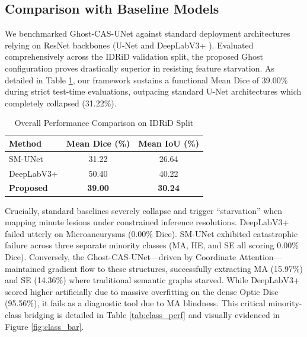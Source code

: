 \subsection{Comparison with Baseline Models}
We benchmarked Ghost-CAS-UNet against standard deployment architectures relying on ResNet backbones (U-Net \cite{unet_2015} and DeepLabV3+ \cite{deeplabv3_2018}). Evaluated comprehensively across the IDRiD validation split, the proposed Ghost configuration proves drastically superior in resisting feature starvation. As detailed in Table \ref{tab:overall_perf}, our framework sustains a functional Mean Dice of 39.00\% during strict test-time evaluations, outpacing standard U-Net architectures which completely collapsed (31.22\%).

\begin{table}[htbp]
\caption{Overall Performance Comparison on IDRiD Split}
\begin{center}
\begin{tabular}{l c c}
\toprule
\textbf{Method} & \textbf{Mean Dice (\%)} & \textbf{Mean IoU (\%)} \\
\midrule
SM-UNet & 31.22 & 26.64 \\
DeepLabV3+ & 50.40 & 40.22 \\
\textbf{Proposed} & \textbf{39.00} & \textbf{30.24} \\
\bottomrule
\end{tabular}
\label{tab:overall_perf}
\end{center}
\end{table}

Crucially, standard baselines severely collapse and trigger ``starvation'' when mapping minute lesions under constrained inference resolutions. DeepLabV3+ failed utterly on Microaneurysms (0.00\% Dice). SM-UNet exhibited catastrophic failure across three separate minority classes (MA, HE, and SE all scoring 0.00\% Dice). Conversely, the Ghost-CAS-UNet—driven by Coordinate Attention—maintained gradient flow to these structures, successfully extracting MA (15.97\%) and SE (14.36\%) where traditional semantic graphs starved. While DeepLabV3+ scored higher artificially due to massive overfitting on the dense Optic Disc (95.56\%), it fails as a diagnostic tool due to MA blindness. This critical minority-class bridging is detailed in Table \ref{tab:class_perf} and visually evidenced in Figure \ref{fig:class_bar}.

